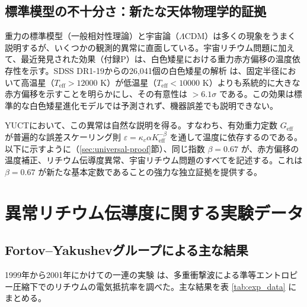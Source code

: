 \documentclass[11pt,a4paper]{article}
\newcommand{\Ke}{K_{\mathrm{eff}}}
\newcommand{\kappac}{\kappa_c}
\newcommand{\alp}{\alpha}
\theoremstyle{remark}
\begin{document}
	\subsection{標準模型の不十分さ：新たな天体物理学的証拠}
	\label{subsec:std-inadequacy}
	
	重力の標準模型（一般相対性理論）と宇宙論（\(\Lambda\)CDM）は多くの現象をうまく説明するが、いくつかの観測的異常に直面している。宇宙リチウム問題に加えて、最近発見された効果（付録P）は、白色矮星における重力赤方偏移の温度依存性を示す。SDSS DR1-19からの26,041個の白色矮星の解析 \cite{Crumpler2024} は、固定半径において高温星（\(T_{\mathrm{eff}} > 12000\) K）が低温星（\(T_{\mathrm{eff}} < 10000\) K）よりも系統的に大きな赤方偏移を示すことを明らかにし、その有意性は \(>6.1\sigma\) である。この効果は標準的な白色矮星進化モデルでは予測されず、機器誤差でも説明できない。
	
	YUCTにおいて、この異常は自然な説明を得る。すなわち、有効重力定数 \(G_{\mathrm{eff}}\) が普遍的な誤差スケーリング則 \(\varepsilon = \kappac \alp \Ke^{-\beta}\) を通して温度に依存するのである。以下に示すように（\ref{sec:universal-proof}節）、同じ指数 \(\beta = 0.67\) が、赤方偏移の温度補正、リチウム伝導度異常、宇宙リチウム問題のすべてを記述する。これは \(\beta = 0.67\) が新たな基本定数であることの強力な独立証拠を提供する。
	
	\section{異常リチウム伝導度に関する実験データ}
	
	\subsection{Fortov–Yakushevグループによる主な結果}
	
	1999年から2001年にかけての一連の実験 \cite{fortov1999, fortov2001, yakushev2002} は、多重衝撃波による準等エントロピー圧縮下でのリチウムの電気抵抗率を調べた。主な結果を表 \ref{tab:exp_data} にまとめる。
	
\end{document}
